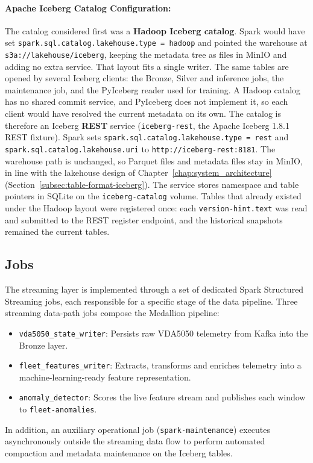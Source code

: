 \paragraph{Apache Iceberg Catalog Configuration:}
The catalog considered first was a \textbf{Hadoop Iceberg catalog}.
Spark would have set \texttt{spark.sql.catalog.\allowbreak lakehouse.type = hadoop} and pointed the warehouse at \texttt{s3a://lakehouse/iceberg}, keeping the metadata tree as files in MinIO and adding no extra service.
That layout fits a single writer.
The same tables are opened by several Iceberg clients: the Bronze, Silver and inference jobs, the maintenance job, and the PyIceberg reader used for training.
A Hadoop catalog has no shared commit service, and PyIceberg does not implement it, so each client would have resolved the current metadata on its own.
The catalog is therefore an Iceberg \textbf{REST} service (\texttt{iceberg-rest}, the Apache Iceberg 1.8.1 REST fixture).
Spark sets \texttt{spark.sql.catalog.lakehouse.type = rest} and \texttt{spark.sql.catalog.lakehouse.uri} to \texttt{http://iceberg-rest:8181}.
The warehouse path is unchanged, so Parquet files and metadata files stay in MinIO, in line with the lakehouse design of Chapter~\ref{chap:system_architecture} (Section~\ref{subsec:table-format-iceberg}).
The service stores namespace and table pointers in SQLite on the \texttt{iceberg-catalog} volume.
Tables that already existed under the Hadoop layout were registered once: each \texttt{version-hint.text} was read and submitted to the REST register endpoint, and the historical snapshots remained the current tables.

\subsection{Jobs} 
The streaming layer is implemented through a set of dedicated Spark Structured Streaming jobs, each responsible for a specific stage of the data pipeline. 
Three streaming data-path jobs compose the Medallion pipeline: 
  \begin{itemize} 
    \item \texttt{vda5050\_state\_writer}: Persists raw VDA5050 telemetry from Kafka into the Bronze layer. 
    \item \texttt{fleet\_features\_writer}: Extracts, transforms and enriches telemetry into a machine-learning-ready feature representation. 
    \item \texttt{anomaly\_detector}: Scores the live feature stream and publishes each window to \texttt{fleet-anomalies}.
  \end{itemize} In addition, an auxiliary operational job (\texttt{spark-maintenance}) executes asynchronously outside the streaming data flow to perform automated compaction and metadata maintenance on the Iceberg tables.

